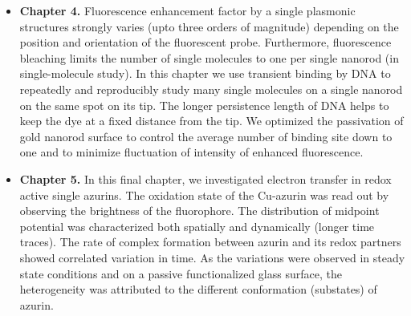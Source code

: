 \begin{itemize}
	\item \textbf{Chapter 4.} Fluorescence enhancement factor by a single plasmonic structures strongly varies (upto three orders of magnitude) depending on the position and orientation of the fluorescent probe. Furthermore, fluorescence bleaching limits the number of single molecules to one per single nanorod (in single-molecule study). In this chapter we use transient binding by DNA to repeatedly and reproducibly study many single molecules on a single nanorod on the same spot on its tip. The longer persistence length of DNA helps to keep the dye at a fixed distance from the tip. We optimized the passivation of gold nanorod surface to control the average number of binding site down to one and to minimize fluctuation of intensity of enhanced fluorescence.

	\item \textbf{Chapter 5.} In this final chapter, we investigated electron transfer in redox active single azurins. The oxidation state of the Cu-azurin was read out by observing the brightness of the fluorophore. The distribution of midpoint potential was characterized both spatially and dynamically (longer time traces). The rate of complex formation between azurin and its redox partners showed correlated variation in time. As the variations were observed in steady state conditions and on a passive functionalized glass surface, the heterogeneity was attributed to the different conformation (substates) of azurin. 
\end{itemize}